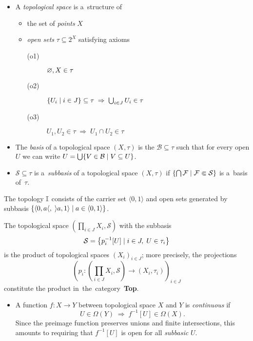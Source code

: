\begin{itemize}
\item A \emph{topological space} is a~structure of
  \begin{itemize}
  \item the set of \emph{points\/} $X$
  \item \emph{open sets\/} $\tau\subseteq 2^X$ satisfying axioms
    \begin{description}
    \item[(o1)] $\varnothing, X \in \tau$
    \item[(o2)] $\left\{ U_i \mid i\in J \right\} \subseteq \tau \; \Rightarrow
    \; \bigcup_{i\in J} U_i \in \tau$
    \item[(o3)] $U_1, U_2 \in \tau \; \Rightarrow \; U_1 \cap U_2 \in \tau$
    \end{description}
  \end{itemize}

\item The \emph{basis} of a topological space $(X, \tau)$ is the
$\mathcal{B}\subseteq \tau$ such that for every open $U$ we can write $U =
\bigcup \{V\in \mathcal{B} \mid V\subseteq U \}$.

\item $\mathcal{S}\subseteq \tau$ is a~\emph{subbasis} of a
topological space $(X, \tau)$ if $\left\{ \bigcap \mathcal{F} \mid \mathcal{F}
\Subset \mathcal{S} \right\}$ is a~basis of~$\tau$.
\end{itemize}

\begin{exmpl}
  The topology $\mathbb{I}$ consists of the carrier set $\langle 0, 1 \rangle$ and open
  sets generated by subbasis $\{ \langle 0, a \langle, \; \rangle a, 1 \rangle
  \mid a\in \langle 0, 1 \rangle \}$.
\end{exmpl}

\begin{fact}
  The topological space $\left( \prod_{i\in J} X_i, \mathcal{S} \right)$ with
  the subbasis
  \[
    \mathcal{S} = \left\{ p_{i}^{-1}[U] \mid i\in J, \; U\in \tau_i \right\}
  \]
  is the product of topological spaces $\left( X_i \right)_{i\in J}$;
  more precisely, the projections
  \[
    \left( p_i\colon \left(\prod_{i\in J} X_i, \mathcal{S}\right) \to
    \left(X_i, \tau_i\right) \right)_{i\in J}
  \]
  constitute the product in~the~category~{\bf Top}.
\end{fact}

\begin{itemize}
\item A function $f\colon X \to Y$ between topological space $X$ and $Y$ is
\emph{continuous} if 
\[
  U\in \Omega(Y) \; \Longrightarrow \; f^{-1}[U]\in \Omega(X).
\]
Since the preimage function preserves unions and finite intersections, this
amounts to requiring that $f^{-1}[U]$ is open for all \emph{subbasic\/} $U$.
\end{itemize}

